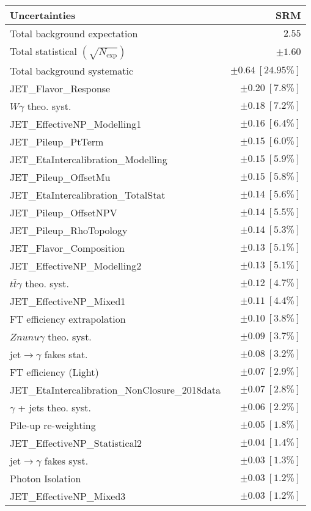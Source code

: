 \begin{tabular}{lr}
\hline
\textbf{Uncertainties} & \textbf{SRM} \\
\hline
Total background expectation & $2.55$ \\
\hline
Total statistical $(\sqrt{N_\mathrm{exp}})$ & $\pm 1.60$ \\
Total background systematic & $\pm 0.64\ [24.95\%]$ \\
\hline
\hline
JET\_Flavor\_Response & $\pm 0.20\ [7.8\%]$ \\
$W\gamma$ theo. syst. & $\pm 0.18\ [7.2\%]$ \\
JET\_EffectiveNP\_Modelling1 & $\pm 0.16\ [6.4\%]$ \\
JET\_Pileup\_PtTerm & $\pm 0.15\ [6.0\%]$ \\
JET\_EtaIntercalibration\_Modelling & $\pm 0.15\ [5.9\%]$ \\
JET\_Pileup\_OffsetMu & $\pm 0.15\ [5.8\%]$ \\
JET\_EtaIntercalibration\_TotalStat & $\pm 0.14\ [5.6\%]$ \\
JET\_Pileup\_OffsetNPV & $\pm 0.14\ [5.5\%]$ \\
JET\_Pileup\_RhoTopology & $\pm 0.14\ [5.3\%]$ \\
JET\_Flavor\_Composition & $\pm 0.13\ [5.1\%]$ \\
JET\_EffectiveNP\_Modelling2 & $\pm 0.13\ [5.1\%]$ \\
$t\bar{t}\gamma$ theo. syst. & $\pm 0.12\ [4.7\%]$ \\
JET\_EffectiveNP\_Mixed1 & $\pm 0.11\ [4.4\%]$ \\
FT efficiency extrapolation & $\pm 0.10\ [3.8\%]$ \\
$Znunu\gamma$ theo. syst. & $\pm 0.09\ [3.7\%]$ \\
jet$\to\gamma$ fakes stat. & $\pm 0.08\ [3.2\%]$ \\
FT efficiency (Light) & $\pm 0.07\ [2.9\%]$ \\
JET\_EtaIntercalibration\_NonClosure\_2018data & $\pm 0.07\ [2.8\%]$ \\
$\gamma$ + jets theo. syst. & $\pm 0.06\ [2.2\%]$ \\
Pile-up re-weighting & $\pm 0.05\ [1.8\%]$ \\
JET\_EffectiveNP\_Statistical2 & $\pm 0.04\ [1.4\%]$ \\
jet$\to\gamma$ fakes syst. & $\pm 0.03\ [1.3\%]$ \\
Photon Isolation & $\pm 0.03\ [1.2\%]$ \\
JET\_EffectiveNP\_Mixed3 & $\pm 0.03\ [1.2\%]$ \\

\end{tabular}
